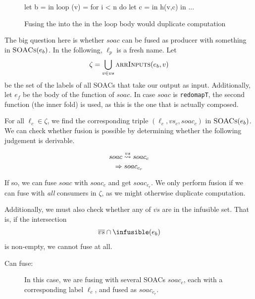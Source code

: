 \begin{description}[style=nextline]
\begin{figure}
\begin{center}
\begin{bcolorcode}
let b =  in
loop (v) = for i < n do
             let c =  in
             h(v,c) in
...
\end{bcolorcode}
\end{center}
\caption{Fusing the  into the  in the loop body would duplicate computation}
\label{fig:cannot-fuse-loop}
\end{figure}

\item[Case $e \equiv \texttt{let \{$\overline{vs}$\} = $soac$ in $e_{b}$}$]

  The big question here is whether $soac$ can be fused as producer
  with something in $\textsc{SOACs}(e_{b})$.  In the following, $\ell_{p}$ is
  a fresh name.  Let
  \[
  \zeta = \bigcup_{v \in vs} \textsc{arrInputs}(e_{b},v)
  \]
  be the set of the labels of all SOACs that take our output as input.
  Additionally, let $e_{f}$ be the body of the function of $soac$.  In
  case $soac$ is \texttt{redomapT}, the second function (the inner
  fold) is used, as this is the one that is actually composed.

  For all $\ell_{c} \in \zeta$, we find the corresponding triple
  $(\ell_{c},vs_{c},soac_{c})$ in $\textsc{SOACs}(e_{b})$.  We can check
  whether fusion is possible by determining whether the following
  judgement is derivable.

\[
   \fusesto
    {vs}
    {soac}
    {soac_{c}}
    {soac_{c_{r}}}
\]

If so, we can fuse $soac$ with $soac_{c}$ and get $soac_{c_{r}}$.  We
only perform fusion if we can fuse with \textit{all} consumers in
$\zeta$, as we might otherwise duplicate computation.

Additionally, we must also check whether any of $\overline{vs}$ are in
the infusible set.  That is, if the intersection
\[
\overline{vs} \cap \infusible(e_{b})
\]
is non-empty, we cannot fuse at all.

\begin{description}
\item[Can fuse:]

  In this case, we are fusing with several SOACs $soac_{c}$, each with
  a corresponding label $\ell_{c}$, and fused as $soac_{c_{r}}$.


\end{description}
\end{description}
